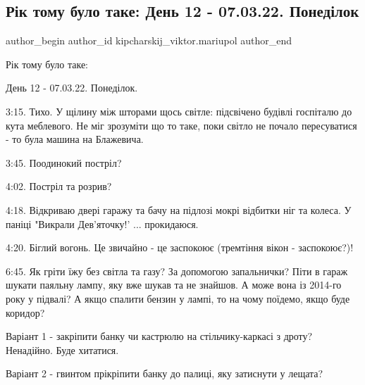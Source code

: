  
 
 
 
 

\subsection{Рік тому було таке:  День 12 - 07.03.22. Понеділок}
\label{sec:07_03_2023.fb.kipcharskij_viktor.mariupol.1.r_k_tomu_bulo_take__}

\ifcmt
 author_begin
   author_id kipcharskij_viktor.mariupol
 author_end
\fi

Рік тому було таке: 

День 12 - 07.03.22. Понеділок. 

3:15. Тихо. У щілину між шторами щось світле: підсвічено будівлі госпіталю до
кута меблевого. Не міг зрозуміти що то таке, поки світло не почало пересуватися
- то була машина на Блажевича.

3:45. Поодинокий постріл?

4:02. Постріл та розрив?


4:18. Відкриваю двері гаражу та бачу на підлозі мокрі відбитки ніг та колеса. У
паніці "Викрали Дев'яточку!' ... прокидаюся.

4:20. Біглий вогонь. Це звичайно - це заспокоює (тремтіння вікон - заспокоює?)!

6:45. Як гріти їжу без світла та газу? За допомогою запальнички? Піти в гараж
шукати паяльну лампу, яку вже шукав та не знайшов. А може вона із 2014-го року
у підвалі? А якщо спалити бензин у лампі, то на чому поїдемо, якщо буде
коридор?

Варіант 1 - закріпити банку чи  кастрюлю на стільчику-каркасі з дроту?
Ненадійно. Буде хитатися.

Варіант 2 - гвинтом прікріпити банку до палиці, яку затиснути у лещата?

